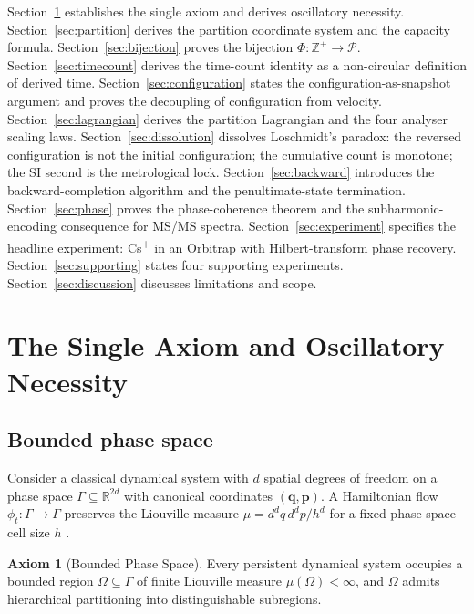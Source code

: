 \documentclass[twocolumn,10pt,a4paper]{article}
\theoremstyle{thmstyle}
\theoremstyle{definition}
\newtheorem{axiom}{Axiom}
\theoremstyle{remark}
\newcommand{\R}{\mathbb{R}}
\newcommand{\Zp}{\mathbb{Z}^{+}}
\newcommand{\Parts}{\mathcal{P}}
\newcommand{\PhiMap}{\varPhi}
\begin{document}
Section~\ref{sec:axiom} establishes the single axiom and derives
oscillatory necessity. Section~\ref{sec:partition} derives the
partition coordinate system and the capacity formula.
Section~\ref{sec:bijection} proves the bijection $\PhiMap:\Zp\to\Parts$.
Section~\ref{sec:timecount} derives the time-count identity as a
non-circular definition of derived time.
Section~\ref{sec:configuration} states the configuration-as-snapshot
argument and proves the decoupling of configuration from velocity.
Section~\ref{sec:lagrangian} derives the partition Lagrangian and the
four analyser scaling laws.
Section~\ref{sec:dissolution} dissolves Loschmidt's paradox: the
reversed configuration is not the initial configuration; the
cumulative count is monotone; the SI second is the metrological lock.
Section~\ref{sec:backward} introduces the backward-completion algorithm
and the penultimate-state termination.
Section~\ref{sec:phase} proves the phase-coherence theorem and the
subharmonic-encoding consequence for MS/MS spectra.
Section~\ref{sec:experiment} specifies the headline experiment:
Cs\textsuperscript{+} in an Orbitrap with Hilbert-transform phase
recovery.
Section~\ref{sec:supporting} states four supporting experiments.
Section~\ref{sec:discussion} discusses limitations and scope.

\section{The Single Axiom and Oscillatory Necessity}
\label{sec:axiom}

\subsection{Bounded phase space}

Consider a classical dynamical system with $d$ spatial degrees of
freedom on a phase space $\Gamma\subseteq\R^{2d}$ with canonical
coordinates $(\mathbf{q},\mathbf{p})$. A Hamiltonian flow
$\phi_{t}:\Gamma\to\Gamma$ preserves the Liouville measure
$\mu=d^{d}q\,d^{d}p/h^{d}$ for a fixed phase-space cell size $h$
\citep{arnold1989}.

\begin{axiom}[Bounded Phase Space]
\label{ax:bps}
Every persistent dynamical system occupies a bounded region
$\Omega\subseteq\Gamma$ of finite Liouville measure
$\mu(\Omega)<\infty$, and $\Omega$ admits hierarchical partitioning
into distinguishable subregions.
\end{axiom}
\end{document}
